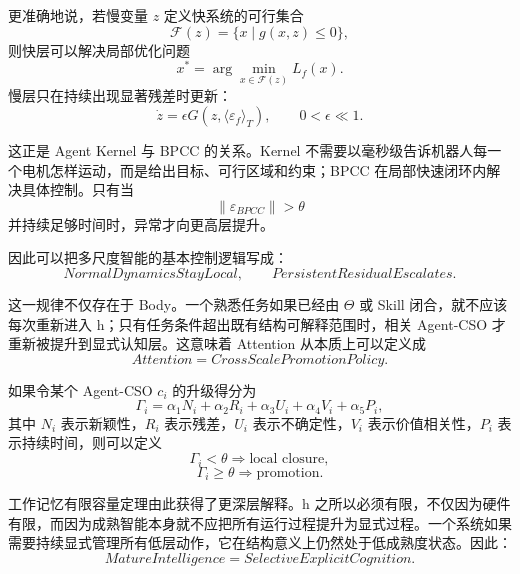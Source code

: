 更准确地说，若慢变量 $z$ 定义快系统的可行集合
\begin{equation}
\mathcal{F}(z)
=
\{x\mid g(x,z)\leq 0\},
\end{equation}
则快层可以解决局部优化问题
\begin{equation}
x^{*}
=
\arg\min_{x\in\mathcal{F}(z)}
L_f(x).
\end{equation}
慢层只在持续出现显著残差时更新：
\begin{equation}
\dot z
=
\epsilon
G
\left(
z,
\langle \varepsilon_f\rangle_T
\right),
\qquad
0<\epsilon\ll1.
\end{equation}

这正是 Agent Kernel 与 BPCC 的关系。Kernel 不需要以毫秒级告诉机器人每一个电机怎样运动，而是给出目标、可行区域和约束；BPCC 在局部快速闭环内解决具体控制。只有当
\begin{equation}
\|\varepsilon_{BPCC}\|
>
\theta
\end{equation}
并持续足够时间时，异常才向更高层提升。

因此可以把多尺度智能的基本控制逻辑写成：
\begin{equation}
\boxed{
NormalDynamicsStayLocal,
\qquad
PersistentResidualEscalates.
}
\end{equation}

这一规律不仅存在于 Body。一个熟悉任务如果已经由 $\Theta$ 或 Skill 闭合，就不应该每次重新进入 h；只有任务条件超出既有结构可解释范围时，相关 Agent-CSO 才重新被提升到显式认知层。这意味着 Attention 从本质上可以定义成
\begin{equation}
\boxed{
Attention
=
CrossScalePromotionPolicy.
}
\end{equation}

如果令某个 Agent-CSO $c_i$ 的升级得分为
\begin{equation}
\Gamma_i
=
\alpha_1N_i
+
\alpha_2R_i
+
\alpha_3U_i
+
\alpha_4V_i
+
\alpha_5P_i,
\end{equation}
其中 $N_i$ 表示新颖性，$R_i$ 表示残差，$U_i$ 表示不确定性，$V_i$ 表示价值相关性，$P_i$ 表示持续时间，则可以定义
\begin{equation}
\Gamma_i<\theta
\Rightarrow
\text{local closure},
\end{equation}
\begin{equation}
\Gamma_i\geq\theta
\Rightarrow
\text{promotion}.
\end{equation}

工作记忆有限容量定理由此获得了更深层解释。h 之所以必须有限，不仅因为硬件有限，而因为成熟智能本身就不应把所有运行过程提升为显式过程。一个系统如果需要持续显式管理所有低层动作，它在结构意义上仍然处于低成熟度状态。因此：
\begin{equation}
\boxed{
MatureIntelligence
=
SelectiveExplicitCognition.
}
\end{equation}

